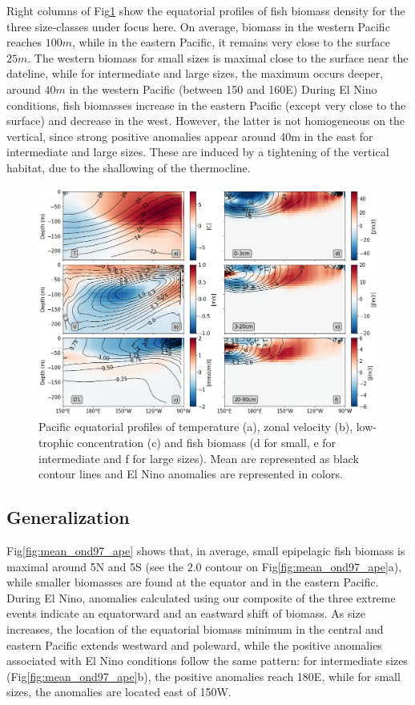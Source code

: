 Right columns of Fig\ref{fig:profiles} show the equatorial profiles of fish biomass density for the three size-classes under focus here. On average, biomass in the western Pacific reaches $100m$, while in the eastern Pacific, it remains very close to the surface $25m$. The western biomass for small sizes is maximal close to the surface near the dateline, while for intermediate and large sizes, the maximum occurs deeper, around $40m$ in the western Pacific (between 150 and 160\degree{}E)
During El Nino conditions, fish biomasses increase in the eastern Pacific (except very close to the surface) and decrease in the west. However, the latter is not homogeneous on the vertical, since strong positive anomalies appear around 40m in the east for intermediate and large sizes. These are induced by a tightening of the vertical habitat, due to the shallowing of the thermocline.

\begin{figure}[h!tp]
	\centering
	\includegraphics[scale=0.4]{figs/forage_mean_ond97.png}	
	\caption{Pacific equatorial profiles of temperature (a), zonal velocity (b), low-trophic concentration (c) and fish biomass (d for small, e for intermediate and f for large sizes). Mean are represented as black contour lines and El Nino anomalies are represented in colors.}	
	\label{fig:profiles}
\end{figure}

\subsection{Generalization}

Fig\ref{fig:mean_ond97_ape} shows that, in average, small epipelagic fish biomass is maximal around 5\degree{}N and 5\degree{}S (see the $2.0$ contour on Fig\ref{fig:mean_ond97_ape}a), while smaller biomasses are found at the equator and in the eastern Pacific. During El Nino, anomalies calculated using our composite of the three extreme events indicate an equatorward and an eastward shift of biomass.
As size increases, the location of the equatorial biomass minimum in the central and eastern Pacific extends westward and poleward, while the positive anomalies associated with El Nino conditions follow the same pattern: for intermediate sizes (Fig\ref{fig:mean_ond97_ape}b), the positive anomalies reach 180\degree{}E, while for small sizes, the anomalies are located east of 150\degree{}W. 

